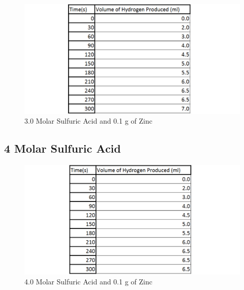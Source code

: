 \begin{figure}[H]
    \includegraphics[width=\textwidth]{./Experiment/Images/5Solubility/3Molar.pdf}
    \caption{3.0 Molar Sulfuric Acid and 0.1 g of Zinc} \label{fig:3MolarSolubilityRawData}
\end{figure}

	\subsection{4 Molar Sulfuric Acid}

\begin{figure}[H]
    \includegraphics[width=\textwidth]{./Experiment/Images/5Solubility/4Molar.pdf}
    \caption{4.0 Molar Sulfuric Acid and 0.1 g of Zinc} \label{fig:4MolarSolubilityRawData}
\end{figure}